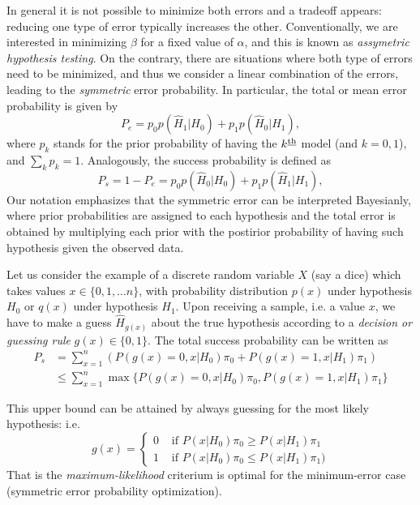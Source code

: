 In general it is not possible to minimize both errors and a tradeoff appears: reducing one type of error typically increases the other. Conventionally, we are interested in minimizing $\beta$ for a fixed value of $\alpha$, and this is known as \textit{assymetric hypothesis testing}. On the contrary, there are situations where both type of errors need to be minimized, and thus we consider a linear combination of the errors, leading to the \textit{symmetric} error probability. In particular, the total or mean error probability is given by
\begin{equation}\label{eq:1_statinf_symm}
P_e =  p_0 p(\hat{H}_1|H_0) + p_1 p(\hat{H}_0|H_1),
\end{equation}
where $p_k$ stands for the prior probability of having the $k^{\text{\underline{th}}}$ model (and $k=0,1$), and $\sum_k p_k=1$. Analogously, the success probability is defined as
\begin{equation}\label{eq:1_statinf_symm_ps}
P_s= 1-P_e =  p_0 p(\hat{H}_0|H_0) + p_1 p(\hat{H}_1|H_1),
\end{equation}
Our notation emphasizes that the symmetric error can be interpreted Bayesianly, where prior probabilities are assigned to each hypothesis and the total error is obtained by multiplying each prior with the postirior probability of having such hypothesis given the observed data.

Let us consider the example of a discrete random variable $X$ (say a dice) which takes values $x\in\{0,1,\ldots n\}$, with probability distribution $p(x)$ under hypothesis $H_{0}$ or $q(x)$ under hypothesis $H_{1}$. Upon receiving a sample, i.e. a value $x$, we have to make a guess $\hat{H}_{g(x)}$ about the true hypothesis according to a \emph{decision or guessing rule} $g(x)\in\{0,1\}$. The total success probability can be written as
\begin{align}
P_{s}&= \sum_{x=1}^{n} \left(P(g(x)=0,x|H_{0})\pi_{0}+P(g(x)=1,x|H_{1})\pi_{1} \right)\nonumber\\
&\leq \sum_{x=1}^{n} \max\{P(g(x)=0,x|H_{0})\pi_{0},P(g(x)=1,x|H_{1})\pi_{1}\}
\end{align}

This upper bound can be attained by always guessing for the most likely hypothesis: i.e.
\begin{equation}
g(x)=\left\{\begin{array}{ll}
0 & \mbox{ if } P(x|H_{0})\pi_{0}\geq P(x|H_{1})\pi_{1} \\
1 &\mbox{ if } P(x|H_{0})\pi_{0}\leq P(x|H_{1})\pi_{1})
\end{array}\right.
\end{equation}
That is the \textit{maximum-likelihood} criterium is optimal for the minimum-error case (symmetric error probability optimization).

